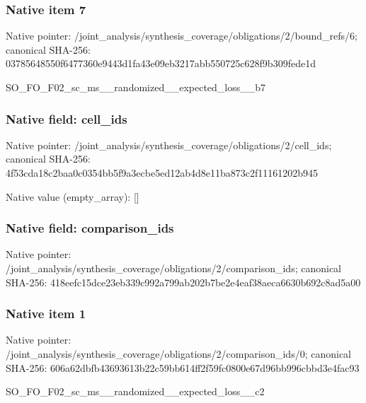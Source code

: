 \documentclass[10pt,a4paper]{article}
\begin{document}
\subsubsection{Native item 7}
Native pointer: /joint\_\allowbreak{}analysis/synthesis\_\allowbreak{}coverage/obligations/2/bound\_\allowbreak{}refs/6; canonical SHA-256: 03785648550f6477360e9443d1fa43e09eb3217abb550725c628f9b309fede1d

\begingroup\raggedright\sloppy SO\_\allowbreak{}FO\_\allowbreak{}F02\_\allowbreak{}sc\_\allowbreak{}ms\_\allowbreak{}\_\allowbreak{}randomized\_\allowbreak{}\_\allowbreak{}expected\_\allowbreak{}loss\_\allowbreak{}\_\allowbreak{}b7\par\endgroup

\subsubsection{Native field: cell\_\allowbreak{}ids}
Native pointer: /joint\_\allowbreak{}analysis/synthesis\_\allowbreak{}coverage/obligations/2/cell\_\allowbreak{}ids; canonical SHA-256: 4f53cda18c2baa0c0354bb5f9a3ecbe5ed12ab4d8e11ba873c2f11161202b945

Native value (empty\_\allowbreak{}array): []

\subsubsection{Native field: comparison\_\allowbreak{}ids}
Native pointer: /joint\_\allowbreak{}analysis/synthesis\_\allowbreak{}coverage/obligations/2/comparison\_\allowbreak{}ids; canonical SHA-256: 418eefc15dce23eb339c992a799ab202b7be2e4eaf38aeca6630b692c8ad5a00

\subsubsection{Native item 1}
Native pointer: /joint\_\allowbreak{}analysis/synthesis\_\allowbreak{}coverage/obligations/2/comparison\_\allowbreak{}ids/0; canonical SHA-256: 606a62dbfb43693613b22c59bb614ff2f59fc0800e67d96bb996cbbd3e4fac93

\begingroup\raggedright\sloppy SO\_\allowbreak{}FO\_\allowbreak{}F02\_\allowbreak{}sc\_\allowbreak{}ms\_\allowbreak{}\_\allowbreak{}randomized\_\allowbreak{}\_\allowbreak{}expected\_\allowbreak{}loss\_\allowbreak{}\_\allowbreak{}c2\par\endgroup
\end{document}
